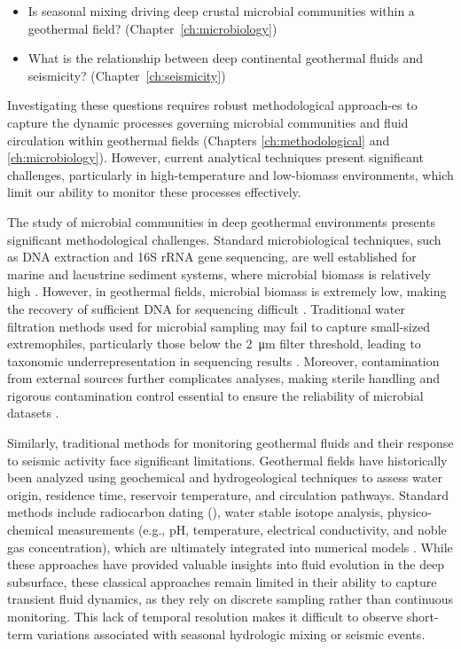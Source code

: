 \begin{itemize}
    \item Is seasonal mixing driving deep crustal microbial communities within a geothermal field? (Chapter~\ref{ch:microbiology})
    \item What is the relationship between deep continental geothermal fluids and seismicity? (Chapter~\ref{ch:seismicity})
\end{itemize}

Investigating these questions requires robust methodological approach-es to capture the dynamic processes governing microbial communities and fluid circulation within geothermal fields (Chapters \ref{ch:methodological} and \ref{ch:microbiology}).
However, current analytical techniques present significant challenges, particularly in high-temperature and low-biomass environments, which limit our ability to monitor these processes effectively.

The study of microbial communities in deep geothermal environments presents significant methodological challenges.
Standard microbiological techniques, such as DNA extraction and 16S rRNA gene sequencing, are well established for marine and lacustrine sediment systems, where microbial biomass is relatively high \citep{lever2015modular}.
However, in geothermal fields, microbial biomass is extremely low, making the recovery of sufficient DNA for sequencing difficult \citep{rzonca2003micro}.
Traditional water filtration methods used for microbial sampling may fail to capture small-sized extremophiles, particularly those below the \SI{2}{\micro\metre} filter threshold, leading to taxonomic underrepresentation in sequencing results \citep{rzonca2003micro,tian2020patesci}.
Moreover, contamination from external sources further complicates analyses, making sterile handling and rigorous contamination control essential to ensure the reliability of microbial datasets \citep{eisenhofer2019contamination}.

Similarly, traditional methods for monitoring geothermal fluids and their response to seismic activity face significant limitations.
Geothermal fields have historically been analyzed using geochemical and hydrogeological techniques to assess water origin, residence time, reservoir temperature, and circulation pathways.
Standard methods include radiocarbon dating (), water stable isotope analysis, physico-chemical measurements (e.g., pH, temperature, electrical conductivity, and noble gas concentration), which are ultimately integrated into numerical models \citep{vuataz1983hydrology, sonney2009numerical, wanner2019quantification, kipfer2002noble}.
While these approaches have provided valuable insights into fluid evolution in the deep subsurface, these classical approaches remain limited in their ability to capture transient fluid dynamics, as they rely on discrete sampling rather than continuous monitoring.
This lack of temporal resolution makes it difficult to observe short-term variations associated with seasonal hydrologic mixing or seismic events.

